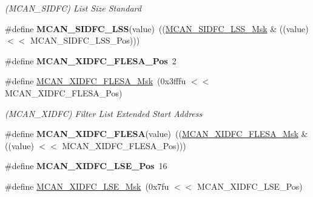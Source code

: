 \begin{DoxyCompactItemize}
\begin{DoxyCompactList}\small\item\em (M\+C\+A\+N\+\_\+\+S\+I\+D\+FC) List Size Standard \end{DoxyCompactList}\item 
\mbox{\label{group__SAME70__MCAN_gac0d6e5712a4a4b7f09be6a4740f753d6}} 
\#define {\bfseries M\+C\+A\+N\+\_\+\+S\+I\+D\+F\+C\+\_\+\+L\+SS}(value)~((\mbox{\hyperlink{group__SAMV71__MCAN_ga1e2bedadca91b09be2fcdbe51235b2d3}{M\+C\+A\+N\+\_\+\+S\+I\+D\+F\+C\+\_\+\+L\+S\+S\+\_\+\+Msk}} \& ((value) $<$$<$ M\+C\+A\+N\+\_\+\+S\+I\+D\+F\+C\+\_\+\+L\+S\+S\+\_\+\+Pos)))
\item 
\mbox{\label{group__SAME70__MCAN_ga9128a13c042981e9e0a23d9b73577a9d}} 
\#define {\bfseries M\+C\+A\+N\+\_\+\+X\+I\+D\+F\+C\+\_\+\+F\+L\+E\+S\+A\+\_\+\+Pos}~2
\item 
\mbox{\label{group__SAME70__MCAN_ga7b250cd29a90d410d512fc8f4c687575}} 
\#define \mbox{\hyperlink{group__SAME70__MCAN_ga7b250cd29a90d410d512fc8f4c687575}{M\+C\+A\+N\+\_\+\+X\+I\+D\+F\+C\+\_\+\+F\+L\+E\+S\+A\+\_\+\+Msk}}~(0x3fffu $<$$<$ M\+C\+A\+N\+\_\+\+X\+I\+D\+F\+C\+\_\+\+F\+L\+E\+S\+A\+\_\+\+Pos)
\begin{DoxyCompactList}\small\item\em (M\+C\+A\+N\+\_\+\+X\+I\+D\+FC) Filter List Extended Start Address \end{DoxyCompactList}\item 
\mbox{\label{group__SAME70__MCAN_ga7599f8541a899056f1247c196356b8c2}} 
\#define {\bfseries M\+C\+A\+N\+\_\+\+X\+I\+D\+F\+C\+\_\+\+F\+L\+E\+SA}(value)~((\mbox{\hyperlink{group__SAMV71__MCAN_ga7b250cd29a90d410d512fc8f4c687575}{M\+C\+A\+N\+\_\+\+X\+I\+D\+F\+C\+\_\+\+F\+L\+E\+S\+A\+\_\+\+Msk}} \& ((value) $<$$<$ M\+C\+A\+N\+\_\+\+X\+I\+D\+F\+C\+\_\+\+F\+L\+E\+S\+A\+\_\+\+Pos)))
\item 
\mbox{\label{group__SAME70__MCAN_ga6e01ed3f23d55f9ffb45296043289f0d}} 
\#define {\bfseries M\+C\+A\+N\+\_\+\+X\+I\+D\+F\+C\+\_\+\+L\+S\+E\+\_\+\+Pos}~16
\item 
\mbox{\label{group__SAME70__MCAN_gae97ae0b9da3a0dd490be81db3eece809}} 
\#define \mbox{\hyperlink{group__SAME70__MCAN_gae97ae0b9da3a0dd490be81db3eece809}{M\+C\+A\+N\+\_\+\+X\+I\+D\+F\+C\+\_\+\+L\+S\+E\+\_\+\+Msk}}~(0x7fu $<$$<$ M\+C\+A\+N\+\_\+\+X\+I\+D\+F\+C\+\_\+\+L\+S\+E\+\_\+\+Pos)

\end{DoxyCompactItemize}
